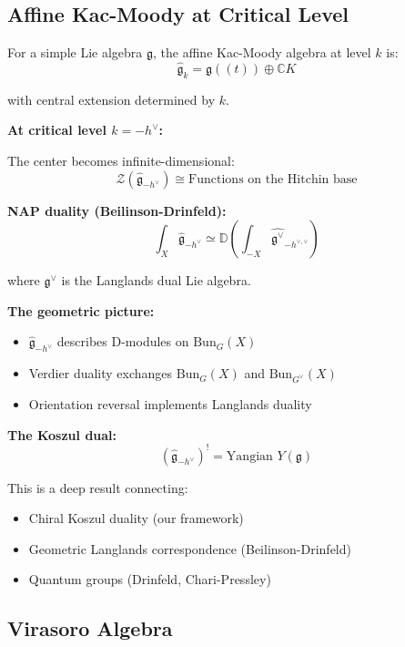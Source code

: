 \subsection{Affine Kac-Moody at Critical Level}

\begin{example}\label{ex:kac-moody-NAP}
For a simple Lie algebra $\mathfrak{g}$, the affine Kac-Moody algebra at level $k$ is:
$$\widehat{\mathfrak{g}}_k = \mathfrak{g}((t)) \oplus \mathbb{C} K$$

with central extension determined by $k$.

\textbf{At critical level $k = -h^\vee$:}

The center becomes infinite-dimensional:
$$\mathcal{Z}(\widehat{\mathfrak{g}}_{-h^\vee}) \cong \text{Functions on the Hitchin base}$$

\textbf{NAP duality (Beilinson-Drinfeld):}
$$\int_X \widehat{\mathfrak{g}}_{-h^\vee} \simeq \mathbb{D}\left(\int_{-X} \widehat{\mathfrak{g}^\vee}_{-h^{\vee,\vee}}\right)$$

where $\mathfrak{g}^\vee$ is the Langlands dual Lie algebra.

\textbf{The geometric picture:}
\begin{itemize}
\item $\widehat{\mathfrak{g}}_{-h^\vee}$ describes D-modules on $\text{Bun}_G(X)$
\item Verdier duality exchanges $\text{Bun}_G(X)$ and $\text{Bun}_{G^\vee}(X)$
\item Orientation reversal implements Langlands duality
\end{itemize}

\textbf{The Koszul dual:}
$$(\widehat{\mathfrak{g}}_{-h^\vee})^! = \text{Yangian } Y(\mathfrak{g})$$

This is a deep result connecting:
\begin{itemize}
\item Chiral Koszul duality (our framework)
\item Geometric Langlands correspondence (Beilinson-Drinfeld)
\item Quantum groups (Drinfeld, Chari-Pressley)
\end{itemize}
\end{example}

\subsection{Virasoro Algebra}

